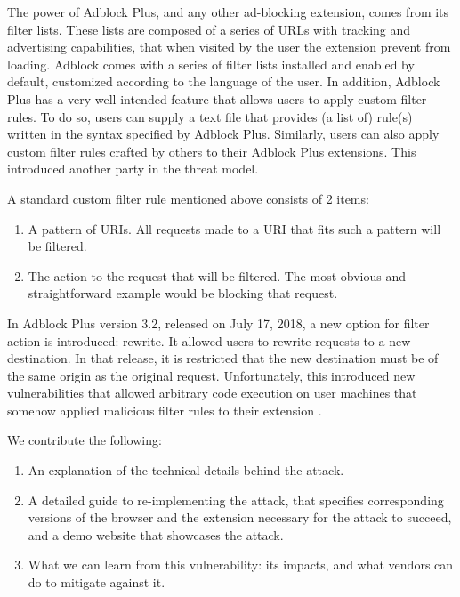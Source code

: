 \documentclass[conference]{IEEEtran}
\begin{document}
The power of Adblock Plus, and any other ad-blocking extension, comes from its filter lists. These lists are composed of a series of URLs with tracking and advertising capabilities, that when visited by the user the extension prevent from loading. Adblock comes with a series of filter lists installed and enabled by default, customized according to the language of the user. In addition, Adblock Plus has a very well-intended feature that allows users to apply custom filter rules. To do so, users can supply a text file that provides (a list of) rule(s) written in the syntax specified by Adblock Plus. Similarly, users can also apply custom filter rules crafted by others to their Adblock Plus extensions. This introduced another party in the threat model.

A standard custom filter rule mentioned above consists of 2 items:
\begin{enumerate}
    \item A pattern of URIs. All requests made to a URI that fits such a pattern will be filtered.
    \item The action to the request that will be filtered. The most obvious and straightforward example would be blocking that request.
\end{enumerate}

In Adblock Plus version 3.2, released on July 17, 2018, a new option for filter action is introduced: rewrite. It allowed users to rewrite requests to a new destination. In that release, it is restricted that the new destination must be of the same origin as the original request. Unfortunately, this introduced new vulnerabilities that allowed arbitrary code execution on user machines that somehow applied malicious filter rules to their extension \cite{abp_code_injection,abp_issue_6622,abp_rewrite_pr,abp_filter_guide}.

We contribute the following:
\begin{enumerate}
    \item An explanation of the technical details behind the attack.
    \item A detailed guide to re-implementing the attack, that specifies corresponding versions of the browser and the extension necessary for the attack to succeed, and a demo website that showcases the attack.
    \item What we can learn from this vulnerability: its impacts, and what vendors can do to mitigate against it.
\end{enumerate}
\end{document}
